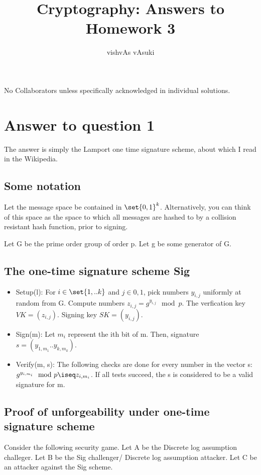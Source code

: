 \documentclass[10pt]{article}
\title{Cryptography: Answers to Homework 3}
\author{vishvAs vAsuki}
\begin{document}
\maketitle

\begin{rem}
 No Collaborators unless specifically acknowledged in individual solutions.
\end{rem}


\section{Answer to question 1}
The answer is simply the Lamport one time signature scheme, about which I read in the Wikipedia.

\subsection*{Some notation}
Let the message space be contained in $\set{0, 1}^{k}$. Alternatively, you can think of this space as the space to which all messages are hashed to by a collision resistant hash function, prior to signing.

Let G be the prime order group of order p. Let g be some generator of G.

\subsection*{The one-time signature scheme Sig}
\begin{itemize}
\item Setup(l): For $i \in \set{1, .. k}$ and $j \in {0, 1}$, pick numbers $y_{i,j}$ uniformly at random from G. Compute numbers $z_{i,j} = g^{y_{i,j}} \mod p$. The verfication key $VK = (z_{i, j})$. Signing key $SK = (y_{i,j})$.
\item Sign(m): Let $m_{i}$ represent the ith bit of m. Then, signature \\
$s = (y_{1, m_{1}} .. y_{k, m_{k}})$.
\item Verify(m, s): The following checks are done for every number in the vector s: $g^{y_{i,m_{i}}} \mod p \iseq z_{i, m_{i}}$. If all tests succeed, the s is considered to be a valid signature for m.
\end{itemize}

\subsection*{Proof of unforgeability under one-time signature scheme}
Consider the following security game. Let A be the Discrete log assumption challeger. Let B be the Sig challenger/ Discrete log assumption attacker. Let C be an attacker against the Sig scheme.
\end{document}
